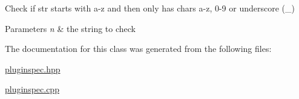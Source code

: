 Check if str starts with a-\/z and then only has chars a-\/z, 0-\/9 or underscore (\+\_\+) 


\begin{DoxyParams}{Parameters}
{\em n} & the string to check \\
\hline
\end{DoxyParams}


The documentation for this class was generated from the following files\+:\begin{DoxyCompactItemize}
\item 
\hyperlink{pluginspec_8hpp}{pluginspec.\+hpp}\item 
\hyperlink{pluginspec_8cpp}{pluginspec.\+cpp}\end{DoxyCompactItemize}
